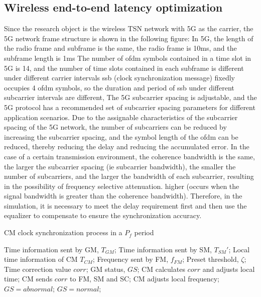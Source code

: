 \documentclass[conference]{IEEEtran}
\begin{document}
	\subsection{Wireless end-to-end latency optimization}\label{CC}
	Since the research object is the wireless TSN network with 5G as the carrier, the 5G network frame structure is shown in the following figure:
	In 5G, the length of the radio frame and subframe is the same, the radio frame is 10ms, and the subframe length is 1ms
	The number of ofdm symbols contained in a time slot in 5G is 14, and the number of time slots contained in each subframe is different under different carrier intervals
	ssb (clock synchronization message) fixedly occupies 4 ofdm symbols, so the duration and period of ssb under different subcarrier intervals are different,
	The 5G subcarrier spacing is adjustable, and the 5G protocol has a recommended set of subcarrier spacing parameters for different application scenarios.
	Due to the assignable characteristics of the subcarrier spacing of the 5G network, the number of subcarriers can be reduced by increasing the subcarrier spacing, and the symbol length of the ofdm can be reduced, thereby reducing the delay and reducing the accumulated error.
	In the case of a certain transmission environment, the coherence bandwidth is the same, the larger the subcarrier spacing (ie subcarrier bandwidth), the smaller the number of subcarriers, and the larger the bandwidth of each subcarrier, resulting in the possibility of frequency selective attenuation. higher (occurs when the signal bandwidth is greater than the coherence bandwidth). Therefore, in the simulation, it is necessary to meet the delay requirement first and then use the equalizer to compensate to ensure the synchronization accuracy.
	
	
	\begin{algorithm}[ht]  
		\caption{CM clock synchronization process in a $P_f$ period}  
		\begin{algorithmic}[1]
			\REQUIRE Time information sent by GM, $T_{GM}$; Time information sent by SM, $T_{SM}'$; Local time information of CM $T_{CM}$; Frequency sent by FM, $f_{FM}$; Preset threshold, $\zeta$;
			\ENSURE Time correction value $corr$; GM status, $GS$;
			\STATE CM calculates $corr$ and adjusts local time;  
			\STATE CM sends $corr$ to FM, SM and SC;
			\STATE CM adjusts local frequency;
			\ENDIF
			\STATE $GS = abnormal$;
			\STATE $GS = normal$;
			\ENDIF
			\ENDIF
			\ENDWHILE
			\ENDWHILE
		\end{algorithmic}
	\end{algorithm}
	
\end{document}

